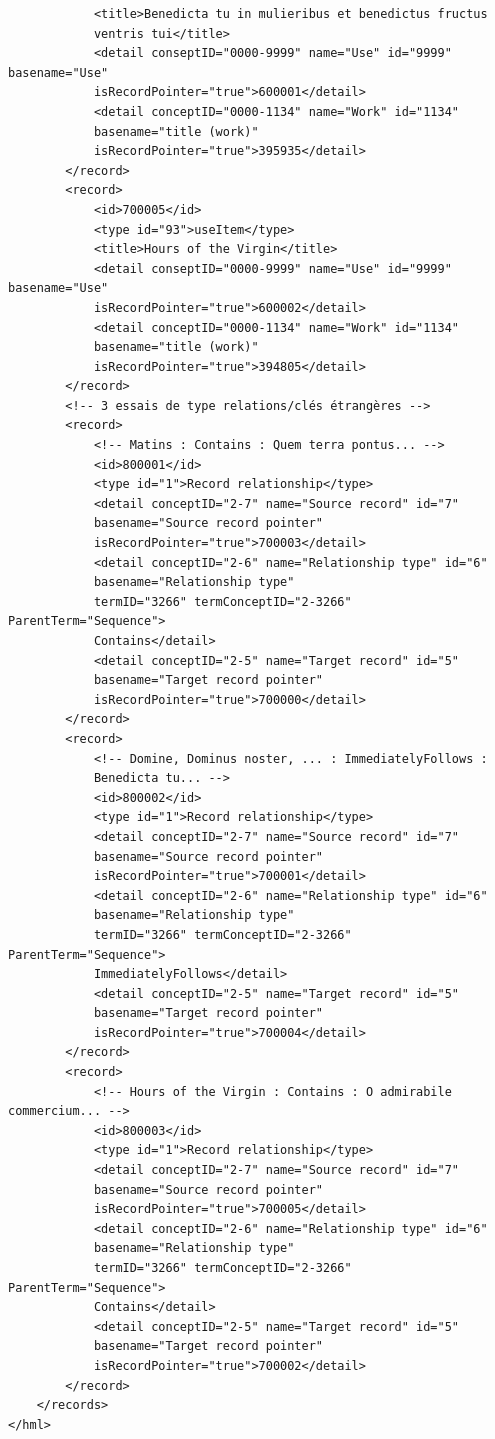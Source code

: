 \documentclass[a4paper,12pt,twoside]{book}
\begin{document}
\begin{verbatim}
            <title>Benedicta tu in mulieribus et benedictus fructus 
            ventris tui</title>
            <detail conseptID="0000-9999" name="Use" id="9999" basename="Use"
            isRecordPointer="true">600001</detail>
            <detail conceptID="0000-1134" name="Work" id="1134" 
            basename="title (work)"
            isRecordPointer="true">395935</detail>
        </record>
        <record>
            <id>700005</id>
            <type id="93">useItem</type>
            <title>Hours of the Virgin</title>
            <detail conseptID="0000-9999" name="Use" id="9999" basename="Use" 
            isRecordPointer="true">600002</detail>
            <detail conceptID="0000-1134" name="Work" id="1134" 
            basename="title (work)"
            isRecordPointer="true">394805</detail>
        </record>
        <!-- 3 essais de type relations/clés étrangères -->
        <record>
            <!-- Matins : Contains : Quem terra pontus... -->
            <id>800001</id>
            <type id="1">Record relationship</type>
            <detail conceptID="2-7" name="Source record" id="7" 
            basename="Source record pointer"
            isRecordPointer="true">700003</detail>
            <detail conceptID="2-6" name="Relationship type" id="6" 
            basename="Relationship type"
            termID="3266" termConceptID="2-3266" ParentTerm="Sequence">
            Contains</detail>
            <detail conceptID="2-5" name="Target record" id="5" 
            basename="Target record pointer"
            isRecordPointer="true">700000</detail>
        </record>
        <record>
            <!-- Domine, Dominus noster, ... : ImmediatelyFollows :
            Benedicta tu... -->
            <id>800002</id>
            <type id="1">Record relationship</type>
            <detail conceptID="2-7" name="Source record" id="7" 
            basename="Source record pointer"
            isRecordPointer="true">700001</detail>
            <detail conceptID="2-6" name="Relationship type" id="6" 
            basename="Relationship type" 
            termID="3266" termConceptID="2-3266" ParentTerm="Sequence">
            ImmediatelyFollows</detail>
            <detail conceptID="2-5" name="Target record" id="5" 
            basename="Target record pointer" 
            isRecordPointer="true">700004</detail>
        </record>
        <record>
            <!-- Hours of the Virgin : Contains : O admirabile commercium... -->
            <id>800003</id>
            <type id="1">Record relationship</type>
            <detail conceptID="2-7" name="Source record" id="7" 
            basename="Source record pointer"
            isRecordPointer="true">700005</detail>
            <detail conceptID="2-6" name="Relationship type" id="6" 
            basename="Relationship type" 
            termID="3266" termConceptID="2-3266" ParentTerm="Sequence">
            Contains</detail>
            <detail conceptID="2-5" name="Target record" id="5" 
            basename="Target record pointer" 
            isRecordPointer="true">700002</detail>
        </record>
    </records>  
</hml>
\end{verbatim}
\end{document}
